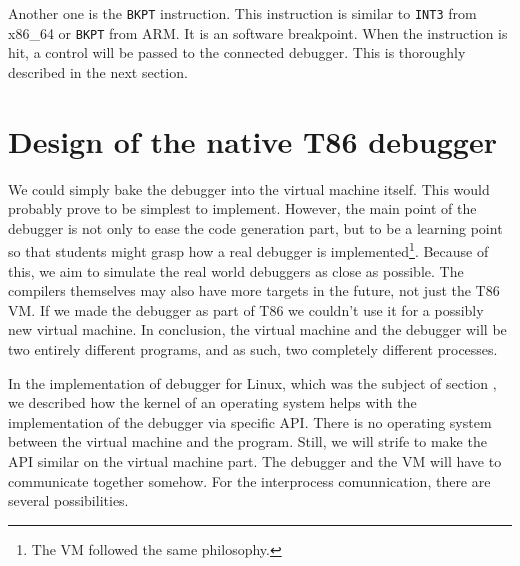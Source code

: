 Another one is the \texttt{BKPT} instruction. This instruction is similar to
\texttt{INT3} from x86\_64 or \texttt{BKPT} from ARM. It is an software
breakpoint. When the instruction is hit, a control will be passed to the
connected debugger. This is thoroughly described in the next section. 

\section{Design of the native T86 debugger}
We could simply bake the debugger into the virtual machine itself. This would
probably prove to be simplest to implement. However, the main point of the
debugger is not only to ease the code generation part, but to be a learning
point so that students might grasp how a real debugger is
implemented\footnote{The VM followed the same philosophy.}. Because of this, we
aim to simulate the real world debuggers as close as possible. The compilers
themselves may also have more targets in the future, not just the T86 VM. If we
made the debugger as part of T86 we couldn't use it for a possibly new virtual
machine. In conclusion, the virtual machine and the debugger will be two
entirely different programs, and as such, two completely different processes.

In the implementation of debugger for Linux, which was the subject of section
, we described how the kernel of an operating system helps with the
implementation of the debugger via specific API. There is no operating system
between the virtual machine and the program. Still, we will strife to make the
API similar on the virtual machine part. The debugger and the VM will have to
communicate together somehow. For the interprocess comunnication, there are
several possibilities.

